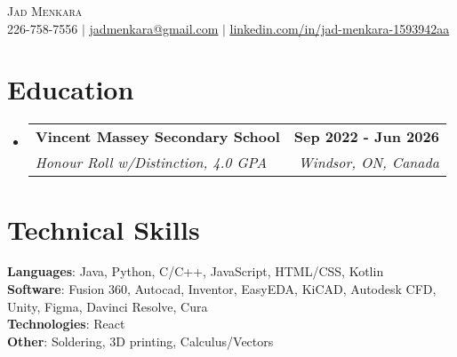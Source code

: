 \documentclass[letterpaper,11pt]{article}
\makeatletter
\newcommand{\resumeSubheading}[4]{
  \vspace{-2pt}\item
    \begin{tabular*}{0.97\textwidth}[t]{l@{\extracolsep{\fill}}r}
      \textbf{#1} & #2 \\
      \textit{\small#3} & \textit{\small #4} \\
    \end{tabular*}\vspace{-7pt}
}
\newcommand{\resumeSubHeadingListStart}{\begin{itemize}[leftmargin=0.15in, label={}]}
\newcommand{\resumeSubHeadingListEnd}{\end{itemize}}
\makeatother
\begin{document}

\begin{center}
    {\Huge \scshape Jad Menkara} \\ \vspace{1pt}
    \small \faPhone \vspace{1pt} 226-758-7556 $|$ \faEnvelope \vspace{1pt} \href{mailto:x@x.com}{\underline{jadmenkara@gmail.com}} $|$  \faLinkedin \vspace{1pt}
    \href{https://linkedin.com/in/...}{\underline{linkedin.com/in/jad-menkara-1593942aa}} %
\end{center}


\section{Education}
  \resumeSubHeadingListStart
    \resumeSubheading
      {Vincent Massey Secondary School}{\textbf {Sep 2022 - Jun 2026}}
      {Honour Roll w/Distinction, 4.0 GPA}{Windsor, ON, Canada}
  \resumeSubHeadingListEnd



\section{Technical Skills}
 \begin{itemize}[leftmargin=0.15in, label={}]
    \small{\item{
     \textbf{Languages}{: Java, Python, C/C++, JavaScript, HTML/CSS, Kotlin} \\
     \textbf{Software}{: Fusion 360, Autocad, Inventor, EasyEDA, KiCAD, Autodesk CFD, Unity, Figma, Davinci Resolve, Cura} \\
     \textbf{Technologies}{: React} \\
     \textbf{Other}{: Soldering, 3D printing, Calculus/Vectors}
     
    }}
 \end{itemize}
\end{document}

